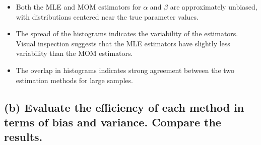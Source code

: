 
\begin{itemize}
    \item Both the MLE and MOM estimators for \(\alpha\) and \(\beta\) are approximately unbiased, with distributions centered near the true parameter values.
    \item The spread of the histograms indicates the variability of the estimators. Visual inspection suggests that the MLE estimators have slightly less variability than the MOM estimators.
    \item The overlap in histograms indicates strong agreement between the two estimation methods for large samples.
\end{itemize}







\newpage
\subsection*{(b) Evaluate the efficiency of each method in terms of bias and variance. Compare the results.}

